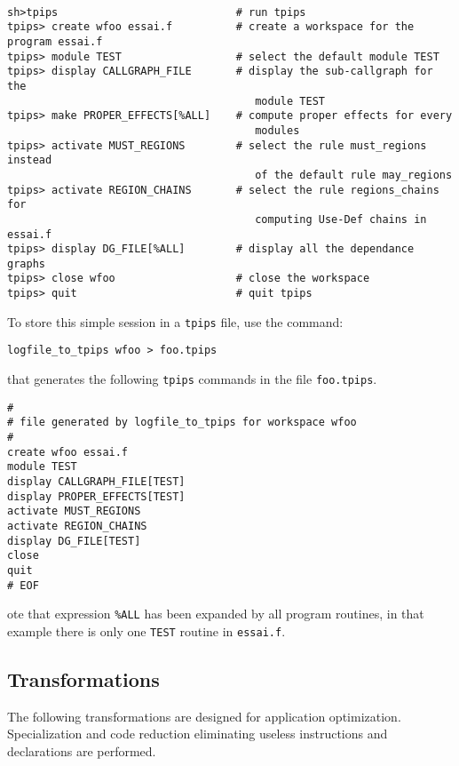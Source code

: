 \documentclass[a4paper]{article}
\begin{document}
\begin{verbatim}

sh>tpips                            # run tpips
tpips> create wfoo essai.f          # create a workspace for the program essai.f
tpips> module TEST                  # select the default module TEST
tpips> display CALLGRAPH_FILE       # display the sub-callgraph for the
                                       module TEST
tpips> make PROPER_EFFECTS[%ALL]    # compute proper effects for every
                                       modules
tpips> activate MUST_REGIONS        # select the rule must_regions instead
                                       of the default rule may_regions
tpips> activate REGION_CHAINS       # select the rule regions_chains for
                                       computing Use-Def chains in essai.f
tpips> display DG_FILE[%ALL]        # display all the dependance graphs
tpips> close wfoo                   # close the workspace
tpips> quit                         # quit tpips
\end{verbatim}

To store this simple session in a {\tt tpips} file, use the command:
\begin{verbatim}
logfile_to_tpips wfoo > foo.tpips
\end{verbatim}
that generates the following {\tt tpips} commands in the file
\verb+foo.tpips+.

\begin{verbatim}
#
# file generated by logfile_to_tpips for workspace wfoo
#
create wfoo essai.f
module TEST
display CALLGRAPH_FILE[TEST]
display PROPER_EFFECTS[TEST]
activate MUST_REGIONS
activate REGION_CHAINS
display DG_FILE[TEST]
close
quit
# EOF
\end{verbatim}

ote that  expression  \verb+%ALL+ has been expanded by all
program routines, in that example there is only one \verb+TEST+
routine in \verb+essai.f+.


\subsection{Transformations}
\label{exm3}

The following transformations are designed for application optimization.
Specialization and code reduction eliminating useless instructions and
declarations are performed.
\end{document}
